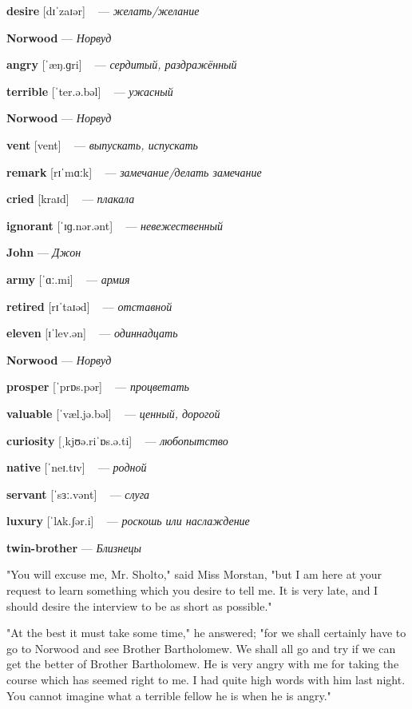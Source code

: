 \documentclass[a4paper,oneside,12pt]{amsart}
\begin{document}
{\large 

 {\bf desire } [dɪˈzaɪər] ~ --- \emph{ желать/желание }

{\bf Norwood } --- \emph{ Норвуд }

{\bf angry } [ˈæŋ.ɡri] ~ --- \emph{ сердитый, раздражённый }

{\bf terrible } [ˈter.ə.bəl] ~ --- \emph{ ужасный }

{\bf Norwood } --- \emph{ Норвуд }

{\bf vent } [vent] ~ --- \emph{ выпускать, испускать }

{\bf remark } [rɪˈmɑːk] ~ --- \emph{ замечание/делать замечание }

{\bf cried } [kraɪd] ~ --- \emph{ плакала }

{\bf ignorant } [ˈɪɡ.nər.ənt] ~ --- \emph{ невежественный }

{\bf John } --- \emph{ Джон }

{\bf army } [ˈɑː.mi] ~ --- \emph{ армия }

{\bf retired } [rɪˈtaɪəd] ~ --- \emph{ отставной }

{\bf eleven } [ɪˈlev.ən] ~ --- \emph{ одиннадцать }

{\bf Norwood } --- \emph{ Норвуд }

{\bf prosper } [ˈprɒs.pər] ~ --- \emph{ процветать }

{\bf valuable } [ˈvæl.jə.bəl] ~ --- \emph{ ценный, дорогой }

{\bf curiosity } [ˌkjʊə.riˈɒs.ə.ti] ~ --- \emph{ любопытство }

{\bf native } [ˈneɪ.tɪv] ~ --- \emph{ родной }

{\bf servant } [ˈsɜː.vənt] ~ --- \emph{ слуга }

{\bf luxury } [ˈlʌk.ʃər.i] ~ --- \emph{ роскошь или наслаждение }

{\bf twin-brother } --- \emph{ Близнецы }

} \vspace{6mm} {\Large 

 
"You will excuse me, Mr. Sholto," said Miss Morstan, "but I am here at your request to learn something which you desire to tell me. It is very late, and I should desire the interview to be as short as possible."

"At the best it must take some time," he answered; "for we shall certainly have to go to Norwood and see Brother Bartholomew. We shall all go and try if we can get the better of Brother Bartholomew. He is very angry with me for taking the course which has seemed right to me. I had quite high words with him last night. You cannot imagine what a terrible fellow he is when he is angry."

}
\end{document}
